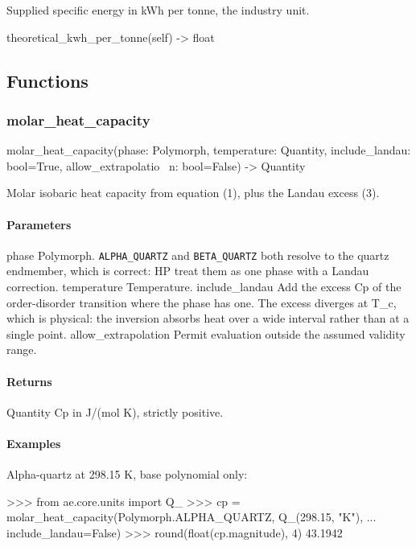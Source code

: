 \documentclass[10pt,a4paper,twoside]{report}
\begin{document}
Supplied specific energy in kWh per tonne, the industry unit.

\begin{verbatimsmall}
theoretical_kwh_per_tonne(self) -> float
\end{verbatimsmall}

\subsection*{Functions}

\subsubsection*{molar\_heat\_capacity}

\begin{verbatimsmall}
molar_heat_capacity(phase: Polymorph, temperature: Quantity, include_landau: bool=True, allow_extrapolatio
    \ n: bool=False) -> Quantity
\end{verbatimsmall}

Molar isobaric heat capacity from equation (1), plus the Landau excess (3).

\paragraph*{Parameters}

phase Polymorph. \texttt{ALPHA\_QUARTZ} and \texttt{BETA\_QUARTZ} both resolve to the quartz endmember, which is correct: HP treat them as one phase with a Landau correction. temperature Temperature. include\_landau Add the excess Cp of the order-disorder transition where the phase has one. The excess diverges at T\_c, which is physical: the inversion absorbs heat over a wide interval rather than at a single point. allow\_extrapolation Permit evaluation outside the assumed validity range.

\paragraph*{Returns}

Quantity Cp in J/(mol K), strictly positive.

\paragraph*{Examples}

Alpha-quartz at 298.15 K, base polynomial only:

\begin{doctestblock}
>>> from ae.core.units import Q_
>>> cp = molar_heat_capacity(Polymorph.ALPHA_QUARTZ, Q_(298.15, "K"),
...                          include_landau=False)
>>> round(float(cp.magnitude), 4)
43.1942
\end{doctestblock}
\end{document}
